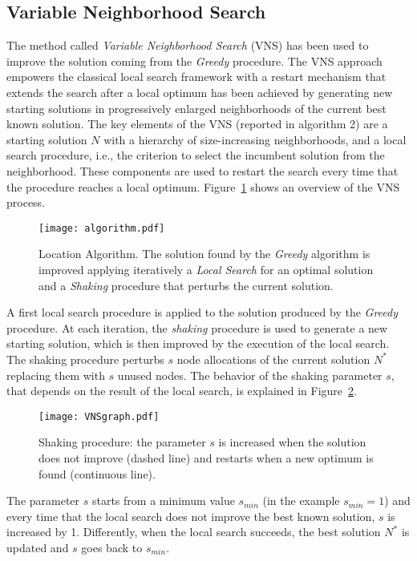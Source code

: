 \subsection{Variable Neighborhood Search}
The method called \emph{Variable Neighborhood Search} (VNS) has been used to improve the solution coming from the \emph{Greedy} procedure. The VNS approach empowers the classical local search framework with a restart mechanism that extends the search after a local optimum has been achieved by generating new starting solutions in progressively enlarged neighborhoods of the current best known solution. The key elements of the VNS (reported in algorithm 2) are a starting solution $N$ with a hierarchy of size-increasing neighborhoods, and a local search procedure, i.e., the criterion to select the incumbent solution from the neighborhood. These components are used to restart the search every time that the procedure reaches a local optimum.
Figure~\ref{fig:algorithm} shows an overview of the VNS process. 
\begin{figure}[h!tb]
\centering\texttt{[image: algorithm.pdf]}
\caption{Location Algorithm. The solution found by the \emph{Greedy} algorithm is improved applying iteratively a \emph{Local Search} for an optimal solution and a \emph{Shaking} procedure that perturbs the current solution.}
\label{fig:algorithm}
\end{figure}
A first local search procedure is applied to the solution produced by the \emph{Greedy} procedure. At each iteration, the \emph{shaking} procedure is used to generate a new starting solution, which is then improved by the execution of the local search. The shaking procedure perturbs \(s\) node allocations of the current solution \(N^*\) replacing them with \(s\) unused nodes. The behavior of the shaking parameter \(s\), that depends on the result of the local search, is explained in Figure~\ref{fig:shaking}. 
\begin{figure}[h!tb]
\centering\texttt{[image: VNSgraph.pdf]}
\caption{Shaking procedure: the parameter $s$ is increased when the solution does not improve (dashed line) and restarts when a new optimum is found (continuous line).}
\label{fig:shaking}
\end{figure}
The parameter \(s\) starts from a minimum value \(s_{min}\) (in the example \(s_{min} = 1 \)) and every time that the local search does not improve the best known solution, \(s\) is increased by 1. Differently, when the local search succeeds, the best solution \(N^*\) is updated and \(s\) goes back to \(s_{min}\).

